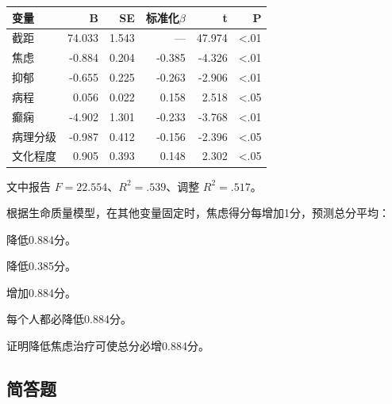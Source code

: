 \begin{center}\small\setlength{\tabcolsep}{3.5pt}\renewcommand{\arraystretch}{1.18}\begin{tabular}{@{}lrrrrr@{}}
\toprule
变量 & B & SE & 标准化\(\beta\) & t & P \\
\midrule

截距 & 74.033 & 1.543 & --- & 47.974 & \textless.01 \\
焦虑 & -0.884 & 0.204 & -0.385 & -4.326 & \textless.01 \\
抑郁 & -0.655 & 0.225 & -0.263 & -2.906 & \textless.01 \\
病程 & 0.056 & 0.022 & 0.158 & 2.518 & \textless.05 \\
癫痫 & -4.902 & 1.301 & -0.233 & -3.768 & \textless.01 \\
病理分级 & -0.987 & 0.412 & -0.156 & -2.396 & \textless.05 \\
文化程度 & 0.905 & 0.393 & 0.148 & 2.302 & \textless.05 \\
\bottomrule\end{tabular}\end{center}

文中报告 \(F=22.554\)、\(R^2=.539\)、调整 \(R^2=.517\)。


\par\addvspace{6pt}\noindent\begin{minipage}{\linewidth}


根据生命质量模型，在其他变量固定时，焦虑得分每增加1分，预测总分平均：


\begin{choices}

\item 降低0.884分。

\item 降低0.385分。

\item 增加0.884分。

\item 每个人都必降低0.884分。

\item 证明降低焦虑治疗可使总分必增0.884分。

\end{choices}

\end{minipage}\par\vspace{4pt}

\subsection{简答题}

